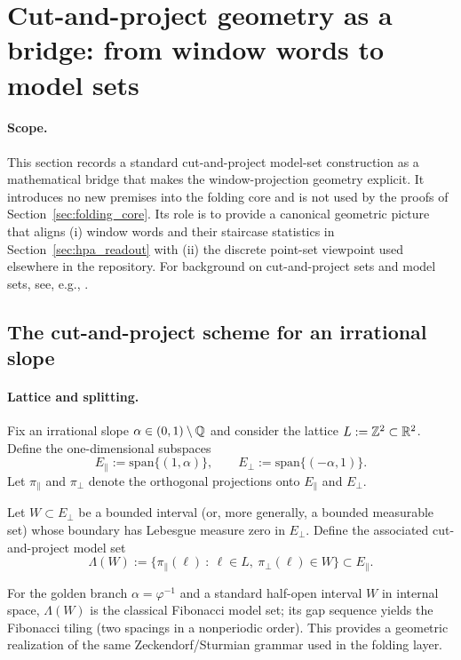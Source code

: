 \section{Cut-and-project geometry as a bridge: from window words to model sets}
\label{sec:cut_and_project_bridge}

\paragraph{Scope.}
\AuditTag This section records a standard cut-and-project model-set construction as a mathematical bridge that makes the window-projection geometry explicit.
It introduces no new premises into the folding core and is not used by the proofs of Section~\ref{sec:folding_core}.
Its role is to provide a canonical geometric picture that aligns (i) window words and their staircase statistics in Section~\ref{sec:hpa_readout} with (ii) the discrete point-set viewpoint used elsewhere in the repository.
For background on cut-and-project sets and model sets, see, e.g., \cite{Moody2000}.

\subsection{The cut-and-project scheme for an irrational slope}
\label{subsec:cut_project_scheme}

\paragraph{Lattice and splitting.}
\MathTag Fix an irrational slope $\alpha\in(0,1)\setminus\mathbb{Q}$ and consider the lattice $L:=\mathbb{Z}^2\subset\mathbb{R}^2$.
Define the one-dimensional subspaces
\[
E_\parallel:=\mathrm{span}\{(1,\alpha)\},
\qquad
E_\perp:=\mathrm{span}\{(-\alpha,1)\}.
\]
Let $\pi_\parallel$ and $\pi_\perp$ denote the orthogonal projections onto $E_\parallel$ and $E_\perp$.

\begin{definition}
\label{def:model_set_lambda_W}
\MathTag Let $W\subset E_\perp$ be a bounded interval (or, more generally, a bounded measurable set) whose boundary has Lebesgue measure zero in $E_\perp$.
Define the associated cut-and-project model set
\[
\Lambda(W):=\{\pi_\parallel(\ell)\ :\ \ell\in L,\ \pi_\perp(\ell)\in W\}\subset E_\parallel.
\]
\end{definition}

\begin{remark}
\AuditTag For the golden branch $\alpha=\varphi^{-1}$ and a standard half-open interval $W$ in internal space, $\Lambda(W)$ is the classical Fibonacci model set; its gap sequence yields the Fibonacci tiling (two spacings in a nonperiodic order).
This provides a geometric realization of the same Zeckendorf/Sturmian grammar used in the folding layer.
\end{remark}

